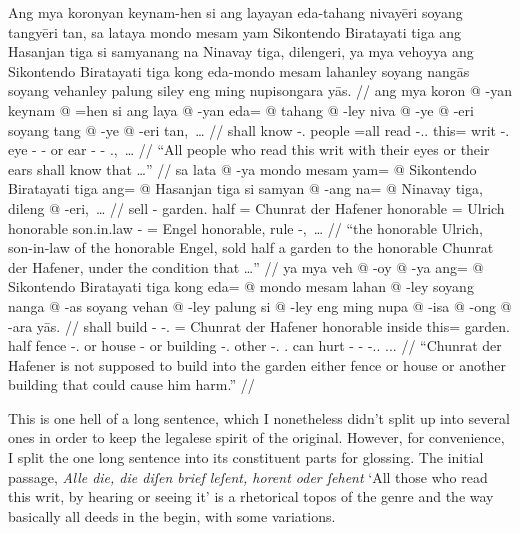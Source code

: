 \documentclass[12pt,paper=a4]{scrartcl}
\newcommand{\fw}[1]{\textit{#1}} %
\begin{document}
\pex
	\glpreamble Ang mya koronyan keynam-hen si ang layayan eda-tahang 
		nivayēri soyang tangyēri tan, sa lataya mondo mesam yam 
		Sikontendo Biratayati tiga ang Hasanjan tiga si samyanang na 
		Nina\-vay tiga, dilengeri, ya mya vehoyya ang Sikontendo 
		Biratayati tiga kong eda-mondo mesam lahanley soyang nangās 
		soyang vehanley palung siley eng ming nupisongara yās. //
	\a \begingl
		\gla ang mya koron @ -yan keynam @ =hen si ang laya @ -yan eda= 
		@ tahang @ -ley niva @ -ye @ -eri soyang tang @ -ye @ -eri 
			tan,~… //
		\glb \AgtT{} shall know -\Tpl{}.\M{} people =all \Rel{} 
			\AgtT{} read -\Tpl{}.\M{}.\Top{} this= writ 
			-\Parg{}.\Inan{} eye -\Pl{} -\Ins{} or ear -\Pl{} 
			-\Ins{} \Tpl{}.\Gen{},~… //
		\glft \enquote{All people who read this writ with their eyes or 
			their ears shall know that …} //
	\endgl
	\a \begingl
		\gla sa lata @ -ya mondo mesam yam= @ Sikontendo Biratayati tiga 
			ang= @ Hasanjan tiga si samyan @ -ang na= @ Ninavay 
			tiga, dileng @ -eri,~… //
		\glb \PatT{} sell -\Tsg{} garden.\Top{} half \Dat{}= Chunrat 
			{der Hafener} honorable \Aarg{}= Ulrich honorable \Rel{} 
			son.in.law -\Aarg{} \Gen{}= Engel honorable, rule 
			-\Ins{},~… //
		\glft \enquote{the honorable Ulrich, son-in-law of the honorable 
			Engel, sold half a garden to the honorable Chunrat der 
			Hafener, under the condition that …} //
	\endgl
	\a \begingl
		\gla ya mya veh @ -oy @ -ya ang= @ Sikontendo Biratayati tiga 
			kong eda= @ mondo mesam lahan @ -ley soyang nanga @ -as 
			soyang vehan @ -ley palung si @ -ley eng ming nupa @ 
			-isa @ -ong @ -ara yās. //
		\glb \LocT{} shall build -\Neg{} -\Tsg{}.\M{} \Aarg{}= 
			Chunrat {der Hafener} honorable inside this= 
			garden.\Top{} half fence -\Parg{}.\Inan{} or house 
			-\Parg{} or building -\Parg{}.\Inan{} other \Rel{} 
			-\Parg{}.\Inan{} \AgtT{}.\Inan{} can hurt -\Caus{} 
			-\Irr{} -\Tsg{}.\Inan{}.\Top{} \Tsg{}.\M{}.\Parg{}. //
		\glft \enquote{Chunrat der Hafener is not supposed to build into 
		the garden either fence or house or another building that could 
		cause him harm.} //
	\endgl
\xe

This is one hell of a long sentence, which I nonetheless didn't split up into 
several ones in order to keep the legalese spirit of the original. However, 
for convenience, I split the one long sentence into its constituent parts 
for glossing. The initial passage, \fw{Alle die, die diſen brief leſent, horent 
oder ſehent} `All those who read this writ, by hearing or seeing it' is a 
rhetorical topos of the genre and the way basically all deeds in the 
 begin, with some variations.
\end{document}

